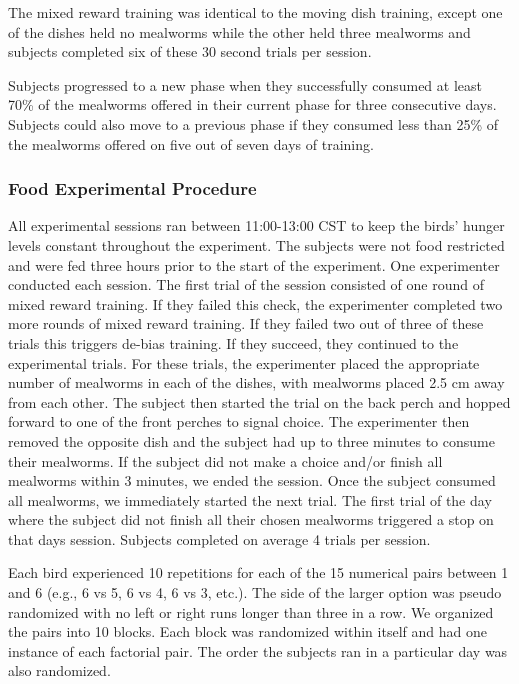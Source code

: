 \documentclass[
]{article}
\begin{document}
The mixed reward training was identical to the moving dish training,
except one of the dishes held no mealworms while the other held three
mealworms and subjects completed six of these 30 second trials per
session.

Subjects progressed to a new phase when they successfully consumed at
least 70\% of the mealworms offered in their current phase for three
consecutive days. Subjects could also move to a previous phase if they
consumed less than 25\% of the mealworms offered on five out of seven
days of training.

\hypertarget{food-experimental-procedure}{%
\subsubsection{Food Experimental
Procedure}\label{food-experimental-procedure}}

All experimental sessions ran between 11:00-13:00 CST to keep the birds'
hunger levels constant throughout the experiment. The subjects were not
food restricted and were fed three hours prior to the start of the
experiment. One experimenter conducted each session. The first trial of
the session consisted of one round of mixed reward training. If they
failed this check, the experimenter completed two more rounds of mixed
reward training. If they failed two out of three of these trials this
triggers de-bias training. If they succeed, they continued to the
experimental trials. For these trials, the experimenter placed the
appropriate number of mealworms in each of the dishes, with mealworms
placed 2.5 cm away from each other. The subject then started the trial
on the back perch and hopped forward to one of the front perches to
signal choice. The experimenter then removed the opposite dish and the
subject had up to three minutes to consume their mealworms. If the
subject did not make a choice and/or finish all mealworms within 3
minutes, we ended the session. Once the subject consumed all mealworms,
we immediately started the next trial. The first trial of the day where
the subject did not finish all their chosen mealworms triggered a stop
on that days session. Subjects completed on average 4 trials per
session.

Each bird experienced 10 repetitions for each of the 15 numerical pairs
between 1 and 6 (e.g., 6 vs 5, 6 vs 4, 6 vs 3, etc.). The side of the
larger option was pseudo randomized with no left or right runs longer
than three in a row. We organized the pairs into 10 blocks. Each block
was randomized within itself and had one instance of each factorial
pair. The order the subjects ran in a particular day was also
randomized.
\end{document}
